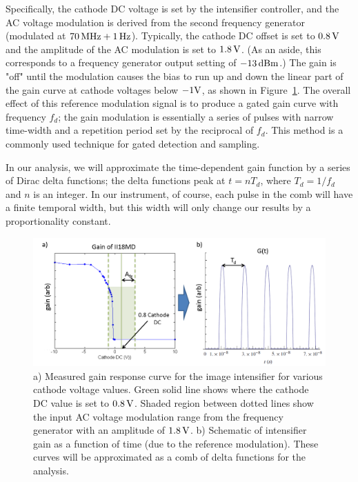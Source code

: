 Specifically, the cathode DC voltage is set by the intensifier controller, and the AC voltage modulation is derived from the second frequency generator (modulated at $70\,{\rm MHz}+1\,{\rm Hz}$). Typically, the cathode DC offset is set to $0.8\,\rm{V}$ and the amplitude of the AC modulation is set to $1.8\,\rm{V}$. (As an aside, this corresponds to a frequency generator output setting of $-13\,\rm{dBm}$.) The gain is "off" until the modulation causes the bias to run up and down the linear part of the gain curve at cathode voltages below $-1\rm{V}$, as shown in Figure~\ref{fig:iigain}. The overall effect of this reference modulation signal is to produce a gated gain curve with frequency $f_d$; the gain modulation is essentially a series of pulses with narrow time-width and a repetition period set by the reciprocal of $f_d$.  This method is a commonly used technique for gated detection and sampling.

In our analysis, we will approximate the time-dependent gain function by a series of Dirac delta functions; the delta functions peak at $t=nT_d$, where $T_d = 1/f_{d}$ and $n$ is an integer. In our instrument, of course, each pulse in the comb will have a finite temporal width, but this width will only change our results by a proportionality constant.  

\begin{figure}[h]
\begin{center}
\includegraphics[width=14.5cm]{./figures/4_Gen3/iigain.png}
\caption[Measured gain response curve for the image intensifier for various cathode voltage values]{a) Measured gain response curve for the image intensifier for various cathode voltage values. Green solid line shows where the cathode DC value is set to $0.8\,\rm{V}$. Shaded region between dotted lines show the input AC voltage modulation range from the frequency generator with an amplitude of $1.8\,\rm{V}$. b) Schematic of intensifier gain as a function of time (due to the reference modulation). These curves will be approximated as a comb of delta functions for the analysis.}
\label{fig:iigain}
\end{center}
\end{figure}

